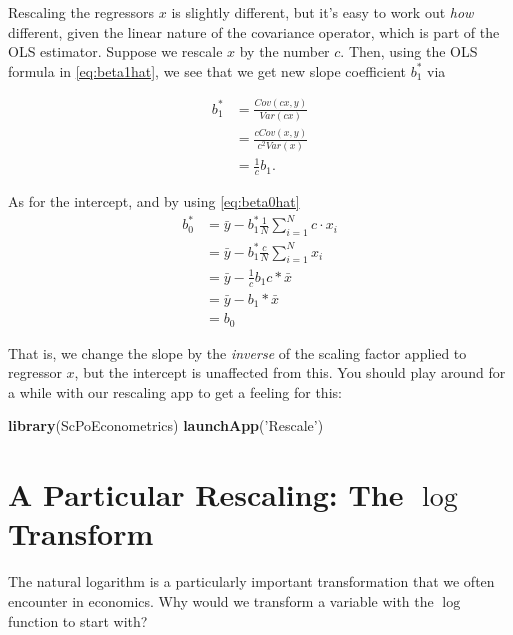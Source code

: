 \documentclass[]{book}
\newenvironment{Shaded}{\begin{snugshade}}{\end{snugshade}}
\newcommand{\KeywordTok}[1]{\textcolor[rgb]{0.13,0.29,0.53}{\textbf{#1}}}
\newcommand{\NormalTok}[1]{#1}
\newcommand{\StringTok}[1]{\textcolor[rgb]{0.31,0.60,0.02}{#1}}
\begin{document}
Rescaling the regressors \(x\) is slightly different, but it's easy to work out \emph{how} different, given the linear nature of the covariance operator, which is part of the OLS estimator. Suppose we rescale \(x\) by the number \(c\). Then, using the OLS formula in \eqref{eq:beta1hat}, we see that we get new slope coefficient \(b_1^*\) via

\begin{align} 
b_1^* &= \frac{Cov(cx,y)}{Var(cx)} \\ 
      &= \frac{cCov(x,y)}{c^2 Var(x)} \\
      &= \frac{1}{c} b_1.
\end{align}

As for the intercept, and by using \eqref{eq:beta0hat}
\begin{align} 
b_0^* &= \bar{y} -             b_1^* \frac{1}{N}\sum_{i=1}^N c \cdot x_i \\ 
      &= \bar{y} -             b_1^* \frac{c}{N}\sum_{i=1}^N x_i  \\
      &= \bar{y} - \frac{1}{c} b_1 c * \bar{x}  \\
      &= \bar{y} -  b_1 * \bar{x}  \\
      &= b_0
\end{align}

That is, we change the slope by the \emph{inverse} of the scaling factor applied to regressor \(x\), but the intercept is unaffected from this. You should play around for a while with our rescaling app to get a feeling for this:

\begin{Shaded}
\begin{Highlighting}[]
\KeywordTok{library}\NormalTok{(ScPoEconometrics)}
\KeywordTok{launchApp}\NormalTok{(}\StringTok{'Rescale'}\NormalTok{)}
\end{Highlighting}
\end{Shaded}

\hypertarget{a-particular-rescaling-the-log-transform}{%
\section{\texorpdfstring{A Particular Rescaling: The \(\log\) Transform}{A Particular Rescaling: The \textbackslash log Transform}}\label{a-particular-rescaling-the-log-transform}}

The natural logarithm is a particularly important transformation that we often encounter in economics. Why would we transform a variable with the \(\log\) function to start with?
\end{document}
